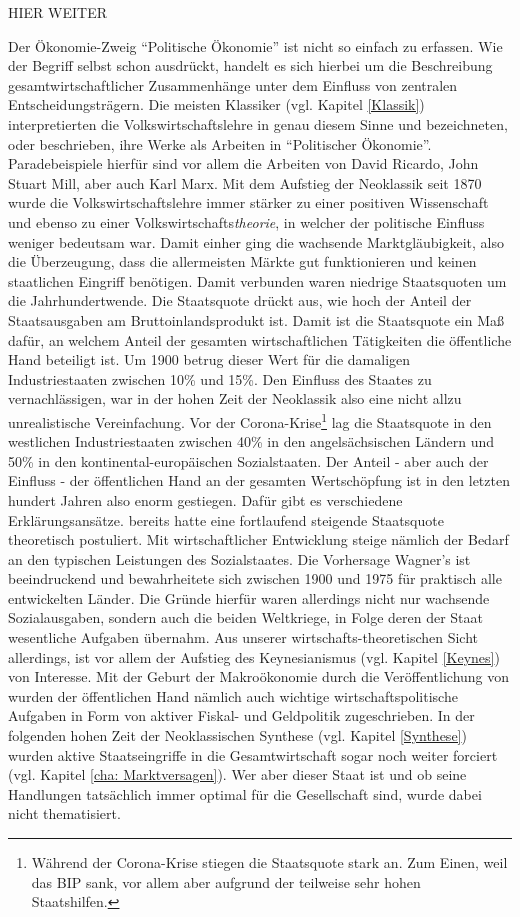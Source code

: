 HIER WEITER \textcite{Backhaus2005}

Der Ökonomie-Zweig "`Politische Ökonomie"' ist nicht so einfach zu erfassen. Wie der Begriff selbst schon ausdrückt, handelt es sich hierbei um die Beschreibung gesamtwirtschaftlicher Zusammenhänge unter dem Einfluss von zentralen Entscheidungsträgern. Die meisten Klassiker (vgl. Kapitel \ref{Klassik}) interpretierten die Volkswirtschaftslehre in genau diesem Sinne und bezeichneten, oder beschrieben, ihre Werke als Arbeiten in "`Politischer Ökonomie"'. Paradebeispiele hierfür sind vor allem die Arbeiten von David Ricardo, John Stuart Mill, aber auch Karl Marx. Mit dem Aufstieg der Neoklassik seit 1870 wurde die Volkswirtschaftslehre immer stärker zu einer positiven Wissenschaft und ebenso zu einer Volkswirtschafts\textit{theorie}, in welcher der politische Einfluss weniger bedeutsam war. Damit einher ging die wachsende Marktgläubigkeit, also die Überzeugung, dass die allermeisten Märkte gut funktionieren und keinen staatlichen Eingriff benötigen. Damit verbunden waren niedrige Staatsquoten um die Jahrhundertwende. Die Staatsquote drückt aus, wie hoch der Anteil der Staatsausgaben am Bruttoinlandsprodukt ist. Damit ist die Staatsquote ein Maß dafür, an welchem Anteil der gesamten wirtschaftlichen Tätigkeiten die öffentliche Hand beteiligt ist. Um 1900 betrug dieser Wert für die damaligen Industriestaaten zwischen 10\% und 15\%. Den Einfluss des Staates zu vernachlässigen, war in der hohen Zeit der Neoklassik also eine nicht allzu unrealistische Vereinfachung. Vor der Corona-Krise\footnote{Während der Corona-Krise stiegen die Staatsquote stark an. Zum Einen, weil das BIP sank, vor allem aber aufgrund der teilweise sehr hohen Staatshilfen.} lag die Staatsquote in den westlichen Industriestaaten zwischen 40\% in den angelsächsischen Ländern und 50\% in den kontinental-europäischen Sozialstaaten. Der Anteil - aber auch der Einfluss - der öffentlichen Hand an der gesamten Wertschöpfung ist in den letzten hundert Jahren also enorm gestiegen. Dafür gibt es verschiedene Erklärungsansätze. \textcite{Wagner1892} bereits hatte eine fortlaufend steigende Staatsquote theoretisch postuliert. Mit wirtschaftlicher Entwicklung steige nämlich der Bedarf an den typischen Leistungen des Sozialstaates. Die Vorhersage Wagner's ist beeindruckend und bewahrheitete sich zwischen 1900 und 1975 für praktisch alle entwickelten Länder. Die Gründe hierfür waren allerdings nicht nur wachsende Sozialausgaben, sondern auch die beiden Weltkriege, in Folge deren der Staat wesentliche Aufgaben übernahm. Aus unserer wirtschafts-theoretischen Sicht allerdings, ist vor allem der Aufstieg des Keynesianismus (vgl. Kapitel \ref{Keynes}) von Interesse. Mit der Geburt der Makroökonomie durch die Veröffentlichung von \textcite{Keynes1936}  wurden der öffentlichen Hand nämlich auch wichtige wirtschaftspolitische Aufgaben in Form von aktiver Fiskal- und Geldpolitik zugeschrieben. In der folgenden hohen Zeit der Neoklassischen Synthese (vgl. Kapitel \ref{Synthese}) wurden aktive Staatseingriffe in die Gesamtwirtschaft sogar noch weiter forciert (vgl. Kapitel \ref{cha: Marktversagen}). Wer aber dieser Staat ist und ob seine Handlungen tatsächlich immer optimal für die Gesellschaft sind, wurde dabei nicht thematisiert. 